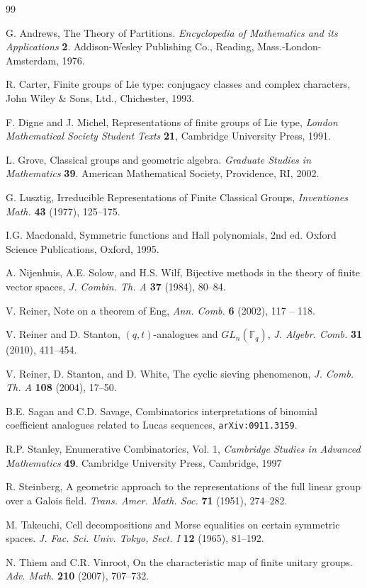 \documentclass[10pt]{amsart}
\theoremstyle{plain}
\theoremstyle{definition}
\theoremstyle{remark}
\numberwithin{equation}{section}
\newcommand\FF{\mathbb{F}}
\begin{document}
\begin{thebibliography}{99}

 G. Andrews,
The Theory of Partitions.
{\it Encyclopedia of Mathematics and its Applications} {\bf 2}.
Addison-Wesley Publishing Co., Reading, Mass.-London-Amsterdam, 1976.


R. Carter,
Finite groups of Lie type: conjugacy classes and complex characters,
John Wiley \& Sons, Ltd., Chichester, 1993.

F. Digne and J. Michel, 
Representations of finite groups of Lie type,
{\it London Mathematical Society Student Texts} {\bf 21}, 
Cambridge University Press, 1991.

L. Grove,
Classical groups and geometric algebra.
{\it Graduate Studies in Mathematics} {\bf 39}. 
American Mathematical Society, Providence, RI, 2002. 

G. Lusztig,
Irreducible Representations of Finite Classical Groups,
{\it Inventiones Math.}  {\bf 43} (1977), 125--175.

I.G. Macdonald, 
Symmetric functions and Hall polynomials, 2nd ed.
Oxford Science Publications, Oxford, 1995.

 A. Nijenhuis, A.E. Solow, and H.S. Wilf,
Bijective methods in the theory of finite
vector spaces, {\it J. Combin. Th. A} {\bf 37} (1984), 80--84.

 V. Reiner,
Note on a theorem of Eng,
{\it Ann. Comb.} {\bf 6} (2002), 117 -- 118. 


  V. Reiner and D. Stanton, $(q,t)$-analogues and $GL_n(\FF_q)$,
{\it J. Algebr. Comb.} {\bf 31} (2010), 411--454.

 V. Reiner, D. Stanton, and D. White,
The cyclic sieving phenomenon,
{\it J. Comb. Th. A} {\bf 108} (2004), 17--50.

B.E. Sagan and C.D. Savage,
Combinatorics interpretations of binomial coefficient
analogues related to Lucas sequences,
{\tt arXiv:0911.3159}.


 R.P. Stanley,
Enumerative Combinatorics, Vol. 1,
{\it Cambridge Studies in Advanced Mathematics} {\bf 49}. 
Cambridge University Press, Cambridge, 1997

R. Steinberg,
A geometric approach to the representations of the full linear group 
over a Galois field.
{\it Trans. Amer. Math. Soc.} {\bf 71} (1951), 274--282. 


M. Takeuchi,
Cell decompositions and Morse equalities on certain symmetric spaces.
{\it J. Fac. Sci. Univ. Tokyo, Sect. I} {\bf 12} (1965), 81--192.

N. Thiem and C.R. Vinroot, 
On the characteristic map of finite unitary groups. 
{\it Adv. Math.} {\bf 210} (2007), 707--732. 
\end{thebibliography}
\end{document}
